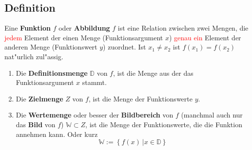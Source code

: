 \subsection{Definition}
Eine \textbf{Funktion} $f$ oder \textbf{Abbildung} $f$ ist eine Relation zwischen zwei Mengen, die \textcolor{red}{jedem} Element der einen Menge (Funktionsargument $x$) \textcolor{red}{genau ein} Element der anderen Menge (Funktionswert $y$) zuordnet. Ist $x_1 \neq x_2$ ist $f(x_1) = f(x_2)$ nat"urlich zul"assig.
\begin{enumerate}
\item Die \textbf{Definitionsmenge} $\mathbb{D}$ von $f$, ist die Menge aus der das Funktionsargument $x$ stammt.
\item Die \textbf{Zielmenge} $Z$ von $f$, ist die Menge der Funktionswerte $y$.
\item Die \textbf{Wertemenge} oder besser der \textbf{Bildbereich} von $f$ (manchmal auch nur das \textbf{Bild} von $f$) $\mathbb{W} \subset Z$, ist die Menge der Funktionswerte, die die Funktion annehmen kann. Oder kurz
\begin{equation*}
\mathbb{W} := \left\{ f(x) \ | x \in \mathbb{D} \right\}
\end{equation*}
\end{enumerate}

